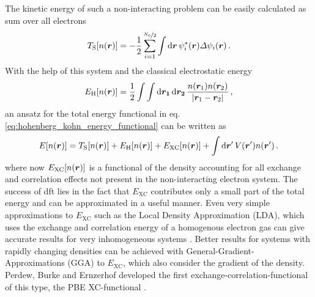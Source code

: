 \documentclass[main.tex]{subfiles}
\begin{document}
The kinetic energy of such a non-interacting problem can be easily calculated as sum over all electrons
\begin{equation}
    T_{\mathrm{S}} [n(\vb*{r})] = - \frac{1}{2} \sum_{i=1}^{\nicefrac{N_{\mathrm{e}}}{2}} \int \dd{\vb*{r}} \psi_i^* (\vb*{r}) \Delta \psi_i (\vb*{r})\,.
\end{equation}
With the help of this system and the classical electrostatic energy 
\begin{equation}
    E_{\mathrm{H}} [n(\vb*{r})] = \frac{1}{2} \int \int \dd{\vb*{r_1}} \dd{\vb*{r_2}} \frac{n(\vb*{r}_1) n(\vb*{r}_2)}{\vert \vb*{r}_1 - \vb*{r}_2 \vert}\,,
\end{equation}
an ansatz for the total energy functional in eq. \ref{eq:hohenberg_kohn_energy_functional} can be written as
\begin{equation}
    E[n(\vb*{r})] = T_{\mathrm{S}} [n(\vb*{r})] + E_{\mathrm{H}} [n(\vb*{r})] + E_{\mathrm{XC}} [n(\vb*{r})] + \int \dd{\vb*{r}^{\prime}} V(\vb*{r}^{\prime}) n (\vb*{r}^{\prime})\,.
\end{equation}
where now \(E_{\mathrm{XC}} [n(\vb*{r})]\) is a functional of the density accounting for all exchange and correlation effects not present in the non-interacting electron system.
The success of \acrshort{dft} lies in the fact that \(E_{\mathrm{XC}}\) contributes only a small part of the total energy and can be approximated in a useful manner. 
Even very simple approximations to \(E_{\mathrm{XC}}\) such as the Local Density Approximation (LDA), which uses the exchange and correlation energy of a homogenous electron gas can give accurate results for very inhomogeneous systems \cite{harris_adiabatic-connection_1984}.
Better results for systems with rapidly changing densities can be achieved with General-Gradient-Approximations (GGA) to \(E_{\mathrm{XC}}\), which also consider the gradient of the density.
Perdew, Burke and Ernzerhof developed the first exchange-correlation-functional of this type, the PBE XC-functional \cite{perdew_generalized_1996}.
\end{document}
